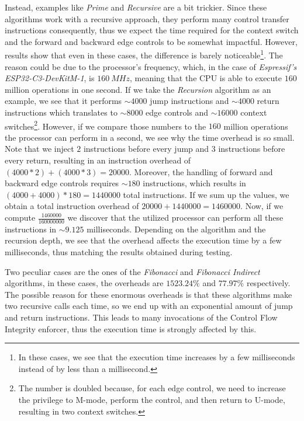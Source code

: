 Instead, examples like \textit{Prime} and \textit{Recursive} are a bit trickier.
Since these algorithms work with a recursive approach, they perform many control
transfer instructions consequently, thus we expect the time required for the context
switch and the forward and backward edge controls to be somewhat impactful.
However, results show that even in these cases, the difference is barely
noticeable\footnote{In these cases, we see that the execution time increases by a
few milliseconds instead of by less than a millisecond.}. The reason could be
due to the processor's frequency, which, in the case of \textit{Espressif's
ESP32-C3-DevKitM-1}, is $160 \ MHz$, meaning that the CPU is able to execute $160$
million operations in one second. If we take the \textit{Recursion} algorithm as
an example, we see that it performs $\sim 4000$ jump instructions and
$\sim 4000$ return instructions which translates to $\sim 8000$ edge controls
and $\sim 16000$ context switches\footnote{The number is doubled because, for each
edge control, we need to increase the privilege to M-mode, perform the control,
and then return to U-mode, resulting in two context switches.}. However, if we compare
those numbers to the $160$ million operations the processor can perform in a second,
we see why the time overhead is so small. Note that we inject $2$ instructions before
every jump and $3$ instructions before every return, resulting in an instruction
overhead of $(4000*2) + (4000*3) = 20000$. Moreover, the handling of forward and
backward edge controls requires $\sim 180$ instructions, which results in $(4000
+ 4000) * 180 = 1440000$ total instructions. If we sum up the values, we obtain a
total instruction overhead of $20000 + 1440000 = 1460000$. Now, if we compute $\frac{1460000}{160000000}$
we discover that the utilized processor can perform all these instructions in $\sim
9.125$ milliseconds. Depending on the algorithm and the recursion depth, we see that
the overhead affects the execution time by a few milliseconds, thus matching the
results obtained during testing.

Two peculiar cases are the ones of the \textit{Fibonacci} and \textit{Fibonacci
Indirect} algorithms, in these cases, the overheads are $1523.24\%$ and
$77.97\%$ respectively. The possible reason for these enormous overheads is that
these algorithms make two recursive calls each time, so we end up with an
exponential amount of jump and return instructions. This leads to many invocations
of the Control Flow Integrity enforcer, thus the execution time is strongly
affected by this.


